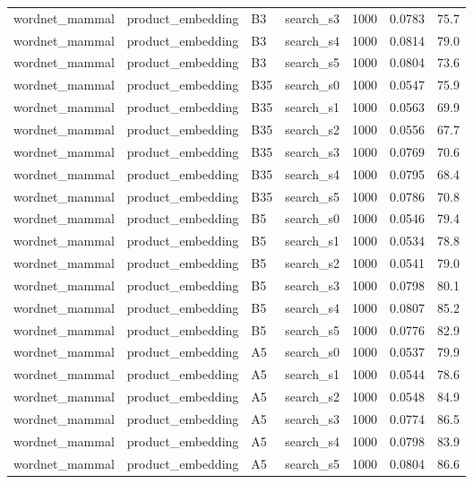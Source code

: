 \begin{longtable}{llllrrr}
wordnet\_mammal & product\_embedding & B3 & search\_s3 & 1000 & 0.0783 & 75.7 \\
wordnet\_mammal & product\_embedding & B3 & search\_s4 & 1000 & 0.0814 & 79.0 \\
wordnet\_mammal & product\_embedding & B3 & search\_s5 & 1000 & 0.0804 & 73.6 \\
wordnet\_mammal & product\_embedding & B35 & search\_s0 & 1000 & 0.0547 & 75.9 \\
wordnet\_mammal & product\_embedding & B35 & search\_s1 & 1000 & 0.0563 & 69.9 \\
wordnet\_mammal & product\_embedding & B35 & search\_s2 & 1000 & 0.0556 & 67.7 \\
wordnet\_mammal & product\_embedding & B35 & search\_s3 & 1000 & 0.0769 & 70.6 \\
wordnet\_mammal & product\_embedding & B35 & search\_s4 & 1000 & 0.0795 & 68.4 \\
wordnet\_mammal & product\_embedding & B35 & search\_s5 & 1000 & 0.0786 & 70.8 \\
\rowcolor{oursbg}
wordnet\_mammal & product\_embedding & B5 & search\_s0 & 1000 & 0.0546 & 79.4 \\
\rowcolor{oursbg}
wordnet\_mammal & product\_embedding & B5 & search\_s1 & 1000 & 0.0534 & 78.8 \\
\rowcolor{oursbg}
wordnet\_mammal & product\_embedding & B5 & search\_s2 & 1000 & 0.0541 & 79.0 \\
\rowcolor{oursbg}
wordnet\_mammal & product\_embedding & B5 & search\_s3 & 1000 & 0.0798 & 80.1 \\
\rowcolor{oursbg}
wordnet\_mammal & product\_embedding & B5 & search\_s4 & 1000 & 0.0807 & 85.2 \\
\rowcolor{oursbg}
wordnet\_mammal & product\_embedding & B5 & search\_s5 & 1000 & 0.0776 & 82.9 \\
wordnet\_mammal & product\_embedding & A5 & search\_s0 & 1000 & 0.0537 & 79.9 \\
wordnet\_mammal & product\_embedding & A5 & search\_s1 & 1000 & 0.0544 & 78.6 \\
wordnet\_mammal & product\_embedding & A5 & search\_s2 & 1000 & 0.0548 & 84.9 \\
wordnet\_mammal & product\_embedding & A5 & search\_s3 & 1000 & 0.0774 & 86.5 \\
wordnet\_mammal & product\_embedding & A5 & search\_s4 & 1000 & 0.0798 & 83.9 \\
wordnet\_mammal & product\_embedding & A5 & search\_s5 & 1000 & 0.0804 & 86.6 \\

\end{longtable}

